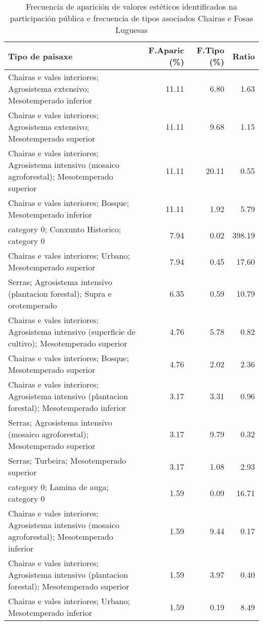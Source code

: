 \begin{table}[p]
\centering
\caption{Frecuencia de aparición de valores estéticos identificados na participación pública e frecuencia de tipos asociados Chairas e Fosas Luguesas} 
\label{vsixotest6}
\begin{tabular}{lrrr}
  \hline
Tipo de paisaxe & F.Aparic (\%) & F.Tipo (\%) & Ratio \\ 
  \hline
Chairas e vales interiores; Agrosistema extensivo; Mesotemperado inferior & 11.11 & 6.80 & 1.63 \\ 
  Chairas e vales interiores; Agrosistema extensivo; Mesotemperado superior & 11.11 & 9.68 & 1.15 \\ 
  Chairas e vales interiores; Agrosistema intensivo (mosaico agroforestal); Mesotemperado superior & 11.11 & 20.11 & 0.55 \\ 
  Chairas e vales interiores; Bosque; Mesotemperado inferior & 11.11 & 1.92 & 5.79 \\ 
  category 0; Conxunto Historico; category 0 & 7.94 & 0.02 & 398.19 \\ 
  Chairas e vales interiores; Urbano; Mesotemperado superior & 7.94 & 0.45 & 17.60 \\ 
  Serras; Agrosistema intensivo (plantacion forestal); Supra e orotemperado & 6.35 & 0.59 & 10.79 \\ 
  Chairas e vales interiores; Agrosistema intensivo (superficie de cultivo); Mesotemperado superior & 4.76 & 5.78 & 0.82 \\ 
  Chairas e vales interiores; Bosque; Mesotemperado superior & 4.76 & 2.02 & 2.36 \\ 
  Chairas e vales interiores; Agrosistema intensivo (plantacion forestal); Mesotemperado inferior & 3.17 & 3.31 & 0.96 \\ 
  Serras; Agrosistema intensivo (mosaico agroforestal); Mesotemperado superior & 3.17 & 9.79 & 0.32 \\ 
  Serras; Turbeira; Mesotemperado superior & 3.17 & 1.08 & 2.93 \\ 
  category 0; Lamina de auga; category 0 & 1.59 & 0.09 & 16.71 \\ 
  Chairas e vales interiores; Agrosistema intensivo (mosaico agroforestal); Mesotemperado inferior & 1.59 & 9.44 & 0.17 \\ 
  Chairas e vales interiores; Agrosistema intensivo (plantacion forestal); Mesotemperado superior & 1.59 & 3.97 & 0.40 \\ 
  Chairas e vales interiores; Urbano; Mesotemperado inferior & 1.59 & 0.19 & 8.49 \\ 

\end{tabular}
\end{table}

